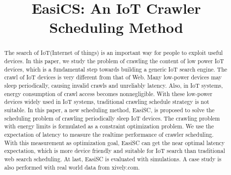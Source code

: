 \documentclass[conference]{IEEEtran}
\begin{document}
%
\title{EasiCS: An IoT Crawler Scheduling Method}

\author{
}

\maketitle


\begin{abstract}
The search of IoT(Internet of things) is an important way for people to exploit useful devices. In this paper, we study the problem of crawling the content of low power IoT devices, which is a fundamental step towards building a generic IoT search engine.
The crawl of IoT devices is very different from that of Web. Many low-power devices may sleep periodically, causing invalid crawls and unreliably latency. Also, in IoT systems, energy consumption of crawl access becomes nonnegligible.
With these low-power devices widely used in IoT systems, traditional crawling schedule strategy is not suitable.
In this paper, a new scheduling method, EasiSC, is proposed to solve the scheduling problem of crawling periodically sleep IoT devices. The crawling problem with energy limits is formulated as a constraint optimization problem. We use the expectation of latency to measure the realtime performance of crawler scheduling. With this measurement as optimization goal, EasiSC can get the near optimal latency expectation, which is more device friendly and suitable for IoT search than traditional web search scheduling.
At last, EasiSC is evaluated with simulations. A case study is also performed with real world data from xively.com.
\end{abstract}
\end{document}
